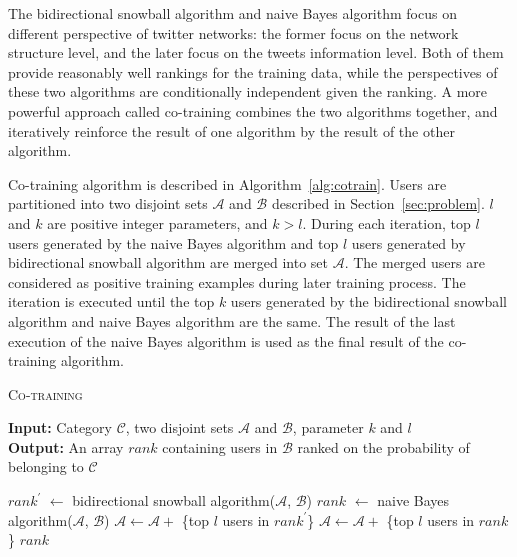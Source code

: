 \documentclass{article}
\begin{document}
The bidirectional snowball algorithm and naive Bayes algorithm focus on different perspective of twitter networks: the former focus on the network structure level, and the later focus on the tweets information level. Both of them provide reasonably well rankings for the training data, while the perspectives of these two algorithms are conditionally independent given the ranking. A more powerful approach called co-training \cite{cotraining} combines the two algorithms together, and iteratively reinforce the result of one algorithm by the result of the other algorithm.


Co-training algorithm is described in Algorithm~\ref{alg:cotrain}. Users are partitioned into two disjoint sets $\mathcal{A}$ and $\mathcal{B}$ described in Section~\ref{sec:problem}. $l$ and $k$ are positive integer parameters, and $k > l$. During each iteration, top $l$ users generated by the naive Bayes algorithm and top $l$ users generated by bidirectional snowball algorithm are merged into set $\mathcal{A}$. The merged users are considered as positive training examples during later training process. The iteration is executed until the top $k$ users generated by the bidirectional snowball algorithm and naive Bayes algorithm are the same. The result of the last execution of the naive Bayes algorithm is used as the final result of the co-training algorithm.

\begin{algorithm}[htbp]
\caption{\textsc{Co-training}}
\textbf{Input: }{Category $\mathcal{C}$, two disjoint sets $\mathcal{A}$ and $\mathcal{B}$, parameter $k$ and $l$}\\
\textbf{Output: }{An array $rank$ containing users in $\mathcal{B}$ ranked on the probability of belonging to $\mathcal{C}$}
\begin{algorithmic}[1]
\REPEAT
\STATE $rank^{\prime}$ $\leftarrow$ bidirectional snowball algorithm($\mathcal{A}$, $\mathcal{B}$)
\STATE $rank$ $\leftarrow$ naive Bayes algorithm($\mathcal{A}$, $\mathcal{B}$)
\STATE $\mathcal{A} \leftarrow \mathcal{A} + $ \{top $l$ users in $rank^{\prime}$\}
\STATE $\mathcal{A} \leftarrow \mathcal{A} + $ \{top $l$ users in $rank$\}
\RETURN $rank$
\end{algorithmic}
\label{alg:cotrain}
\end{algorithm}

\ifx \allfiles \undefined
\end{document}
